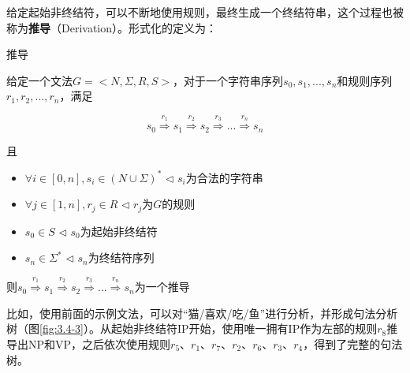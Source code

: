 \parinterval 给定起始非终结符，可以不断地使用规则，最终生成一个终结符串，这个过程也被称为{\small\sffamily\bfseries{推导}}（Derivation）。形式化的定义为：

\vspace{0.5em}
\begin{definition} 推导

给定一个文法$G=<N,\varSigma,R,S>$，对于一个字符串序列$s_0,s_1,...,s_n$和规则序列$r_1,r_2,...,r_n$，满足

\vspace{-0.5em}
\begin{displaymath}
s_0 \overset{r_1}{\Rightarrow} s_1 \overset{r_2}{\Rightarrow} s_2 \overset{r_3}{\Rightarrow} ... \overset{r_{n}}{\Rightarrow} s_n
\end{displaymath}

且
\begin{itemize}
\vspace{0.5em}
\item $\forall i \in [0,n], s_i \in (N\cup\varSigma)^*$ \hspace{3.5em} $\lhd$ $s_i$为合法的字符串
\vspace{0.5em}
\item $\forall j \in [1,n], r_j \in R$ \hspace{6.3em} $\lhd$ $r_j$为$G$的规则
\vspace{0.5em}
\item $s_0 \in S$ \hspace{10.9em} $\lhd$ $s_0$为起始非终结符
\vspace{0.5em}
\item $s_n \in \varSigma^{*}$ \hspace{10.4em} $\lhd$ $s_n$为终结符序列
\vspace{0.5em}
\end{itemize}

\vspace{0.8em}
则$s_0 \overset{r_1}{\Rightarrow} s_1 \overset{r_2}{\Rightarrow} s_2 \overset{r_3}{\Rightarrow} ... \overset{r_{n}}{\Rightarrow} s_n$为一个推导
\end{definition}

\parinterval 比如，使用前面的示例文法，可以对“猫/喜欢/吃/鱼”进行分析，并形成句法分析树（图\ref{fig:3.4-3}）。从起始非终结符IP开始，使用唯一拥有IP作为左部的规则$r_8$推导出NP和VP，之后依次使用规则$r_5$、$r_1$、$r_7$、$r_2$、$r_6$、$r_3$、$r_4$，得到了完整的句法树。

